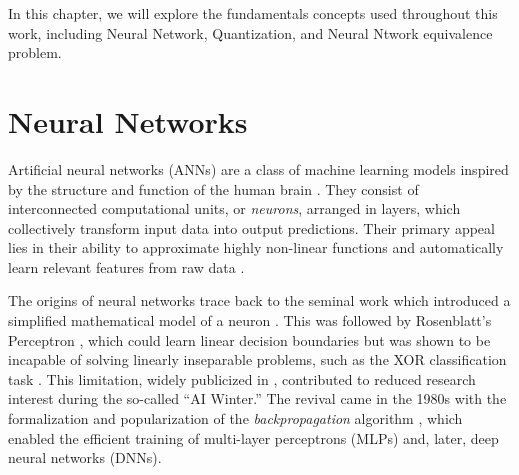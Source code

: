 In this chapter, we will explore the fundamentals concepts used throughout this work, including Neural Network, Quantization, and Neural Ntwork equivalence problem.


\section{Neural Networks}
\label{sec:nn}

Artificial neural networks (ANNs) are a class of machine learning models inspired by the structure and function of the human brain \cite{mcculloch1943logical}. They consist of interconnected computational units, or \textit{neurons}, arranged in layers, which collectively transform input data into output predictions. Their primary appeal lies in their ability to approximate highly non-linear functions and automatically learn relevant features from raw data \cite{goodfellow2016deep}.

The origins of neural networks trace back to the seminal work which introduced a simplified mathematical model of a neuron \cite{mcculloch1943logical}. This was followed by Rosenblatt's Perceptron \cite{Rosenblatt1958}, which could learn linear decision boundaries but was shown to be incapable of solving linearly inseparable problems, such as the XOR classification task \cite{minsky1969perceptrons}. This limitation, widely publicized in \cite{minsky1969perceptrons}, contributed to reduced research interest during the so-called ``AI Winter.'' The revival came in the 1980s with the formalization and popularization of the \textit{backpropagation} algorithm \cite{werbos1974beyond,rumelhart1986learning}, which enabled the efficient training of multi-layer perceptrons (MLPs) and, later, deep neural networks (DNNs).

